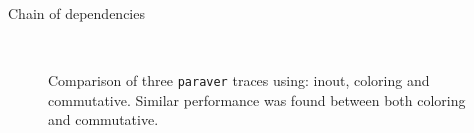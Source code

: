 \documentclass{beamer}
\begin{document}
\begin{frame}[fragile]{Chain of dependencies}
\begin{figure}[h]%
	\centering
	\\
	\caption{Comparison of three \texttt{paraver} traces using: inout, coloring 
	and commutative. Similar performance was found between both coloring and 
	commutative.}
\end{figure}%
\end{frame}
\end{document}
